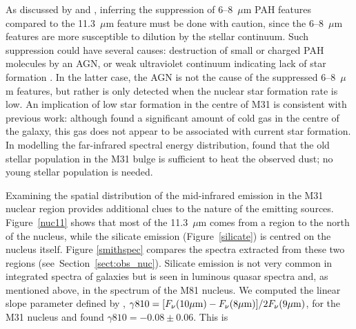 As discussed by  \citet{Smith:2007lr} and \citet{Smith2010}, inferring the suppression of 6--8~$\mu$m PAH features compared
to the 11.3~$\mu$m feature must be done with caution, since the 6--8~$\mu$m features are more susceptible to dilution by the stellar
continuum. Such suppression could have several causes: destruction of small or charged PAH molecules by an AGN,
or weak ultraviolet continuum indicating lack of star formation \citep{Smith:2007lr}. In the latter case, the AGN is not the cause of
the suppressed  6--8~$\mu$m features, but rather is only detected when the nuclear star formation rate is low.
An implication of low star formation in the centre of M31 is consistent
with previous work: although \citet{Melchior2013} found a significant amount of cold gas in the centre of the galaxy, this gas does not
appear to be associated with current star formation. In modelling the far-infrared spectral energy distribution, \cite{Groves2012} found that  
the old stellar population in the M31 bulge is sufficient  to heat the observed dust; no young stellar population is needed.


Examining the spatial distribution of the mid-infrared emission in the M31 nuclear region provides additional clues
to the nature of the emitting sources. Figure~\ref{nuc11} shows that most of the 11.3~$\mu$m comes from a region to the
north of the nucleus, while the silicate emission (Figure~\ref{silicate}) is centred on the nucleus itself.  Figure \ref{smithspec}
compares the spectra extracted from these two regions (see~Section~\ref{sect:obs_nuc}). Silicate emission is not very common in
integrated spectra of galaxies \citep{Spoon2007} but is seen in luminous quasar spectra \citep{Hill14} and, as mentioned above, in the
spectrum of the M81 nucleus. We computed the linear slope parameter  defined by \citet{Smith2010},
$\gamma810 =[F_{\nu}(10\mu{\rm m}) -F_{\nu}(8\mu{\rm m})]/2F_{\nu}(9\mu{\rm m}) $, for the M31 nucleus and
found $\gamma810 =-0.08\pm 0.06$.  This is 


